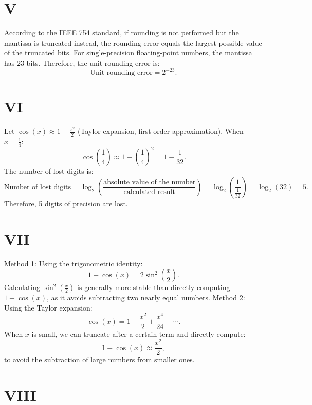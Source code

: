 \documentclass{article}
\begin{document}
\section{V}

According to the IEEE 754 standard, if rounding is not performed but the mantissa is truncated instead, the rounding error equals the largest possible value of the truncated bits.  
For single-precision floating-point numbers, the mantissa has 23 bits. Therefore, the unit rounding error is:  
\[
\text{Unit rounding error} = 2^{-23}.
\]

\section{VI}

Let \( \cos(x) \approx 1 - \frac{x^2}{2} \) (Taylor expansion, first-order approximation).  
When \( x = \frac{1}{4} \):  
\[
\cos\left(\frac{1}{4}\right) \approx 1 - \left(\frac{1}{4}\right)^2 = 1 - \frac{1}{32}.
\]  
The number of lost digits is:  
\[
\text{Number of lost digits} = \log_2 \left( \frac{\text{absolute value of the number}}{\text{calculated result}} \right) = \log_2 \left( \frac{1}{\frac{1}{32}} \right) = \log_2 (32) = 5.
\]  
Therefore, 5 digits of precision are lost.

\section{VII}
Method 1: 
Using the trigonometric identity: 
\[ 
1 - \cos(x) = 2\sin^2\left(\frac{x}{2}\right). 
\] 
Calculating \( \sin^2\left(\frac{x}{2}\right) \) is generally more stable than directly computing \( 1 - \cos(x) \), as it avoids subtracting two nearly equal numbers. 
Method 2: 
Using the Taylor expansion: 
\[ 
\cos(x) = 1 - \frac{x^2}{2} + \frac{x^4}{24} - \cdots. 
\] 
When \( x \) is small, we can truncate after a certain term and directly compute: 
\[ 
1 - \cos(x) \approx \frac{x^2}{2}, 
\] 
to avoid the subtraction of large numbers from smaller ones. 



\section{ VIII}
\end{document}
